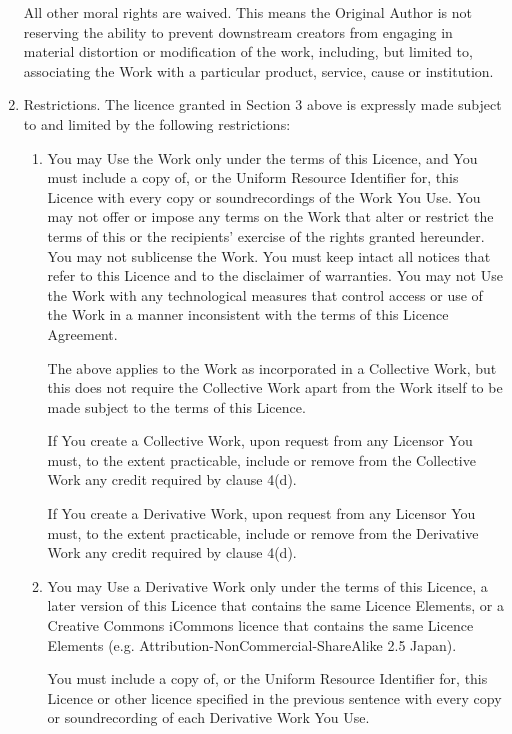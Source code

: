 \begin{enumerate}
      All other moral rights are waived. This means the Original Author is not reserving the ability to prevent downstream creators from engaging in material distortion or modification of the work, including, but limited to, associating the Work with a particular product, service, cause or institution.

   \item Restrictions. The licence granted in Section 3 above is expressly made subject to and limited by the following restrictions:
	\begin{enumerate}
        \item You may Use the Work only under the terms of this Licence, and You must include a copy of, or the Uniform Resource Identifier for, this Licence with every copy or soundrecordings of the Work You Use. You may not offer or impose any terms on the Work that alter or restrict the terms of this or the recipients' exercise of the rights granted hereunder. You may not sublicense the Work. You must keep intact all notices that refer to this Licence and to the disclaimer of warranties. You may not Use the Work with any technological measures that control access or use of the Work in a manner inconsistent with the terms of this Licence Agreement.

            The above applies to the Work as incorporated in a Collective Work, but this does not require the Collective Work apart from the Work itself to be made subject to the terms of this Licence.

            If You create a Collective Work, upon request from any Licensor You must, to the extent practicable, include or remove from the Collective Work any credit required by clause 4(d).

            If You create a Derivative Work, upon request from any Licensor You must, to the extent practicable, include or remove from the Derivative Work any credit required by clause 4(d).
	
         \item You may Use a Derivative Work only under the terms of this Licence, a later version of this Licence that contains the same Licence Elements, or a Creative Commons iCommons licence that contains the same Licence Elements (e.g. Attribution-NonCommercial-ShareAlike 2.5 Japan).

            You must include a copy of, or the Uniform Resource Identifier for, this Licence or other licence specified in the previous sentence with every copy or soundrecording of each Derivative Work You Use.


\end{enumerate}
\end{enumerate}
